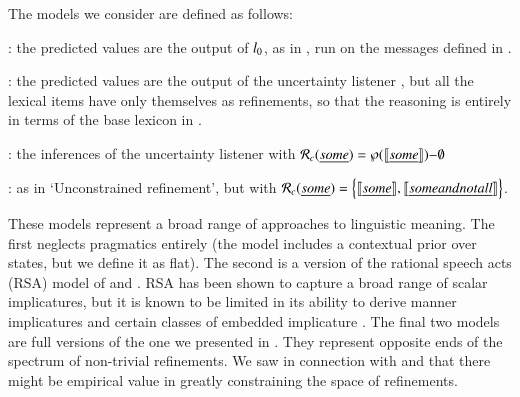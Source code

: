 \documentclass[leqno,12pt]{article}
\begin{document}
The models we consider are defined as follows:
%
\begin{examples}
\item 
  \begin{examples}
  \item {}: the predicted values are the output
    of $l_{0}$, as in , run on the messages
    defined in .
  \item {}: the predicted values are the
    output of the uncertainty listener , but all the
    lexical items have only themselves as refinements, so that the
    reasoning is entirely in terms of the base lexicon in
    .
  \item {}: the inferences of the
    uncertainty listener  with $\mathcal{R}_{c}(\emph{some})
    = \wp(\llbracket\emph{some}\rrbracket){-}\emptyset$
  \item {}: as in `Unconstrained
    refinement', but with $\mathcal{R}_{c}(\emph{some}) =
    \left\{ \llbracket\emph{some}\rrbracket, \llbracket\emph{some and not all}\rrbracket \right\}$.
  \end{examples}
\end{examples}

These models represent a broad range of approaches to linguistic
meaning. The first neglects pragmatics entirely (the model includes a
contextual prior over states, but we define it as flat). The second is
a version of the rational speech acts (RSA) model of
\citet{Frank:Goodman:2012} and \citet{Goodman:Stuhlmuller:2013}. RSA
has been shown to capture a broad range of scalar implicatures, but it
is known to be limited in its ability to derive manner implicatures
and certain classes of embedded implicature
\citep{Bergen:Goodman:Levy:2012,Bergen:Levy:Goodman:2014}. The final
two models are full versions of the one we presented in
. They represent opposite ends of the spectrum of
non-trivial refinements. We saw in connection with
 and  that there
might be empirical value in greatly constraining the space of
refinements.
\end{document}
